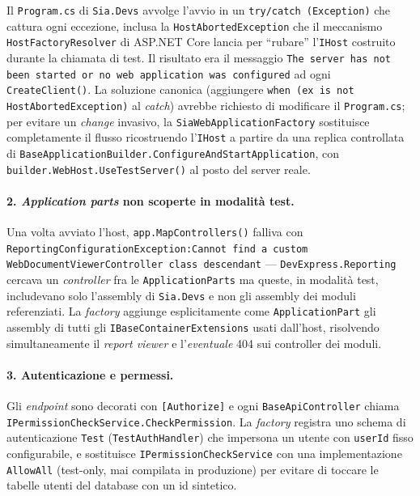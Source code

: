Il \texttt{Program.cs} di \texttt{Sia.Devs} avvolge l'avvio in un \texttt{try/catch (Exception)} che cattura ogni eccezione, inclusa la \texttt{HostAbortedException} che il meccanismo \texttt{HostFactoryResolver} di ASP.NET Core lancia per ``rubare'' l'\texttt{IHost} costruito durante la chiamata di test. Il risultato era il messaggio \texttt{The server has not been started or no web application was configured} ad ogni \texttt{CreateClient()}. La soluzione canonica (aggiungere \texttt{when (ex is not HostAbortedException)} al \emph{catch}) avrebbe richiesto di modificare il \texttt{Program.cs}; per evitare un \emph{change} invasivo, la \texttt{SiaWebApplicationFactory} sostituisce completamente il flusso ricostruendo l'\texttt{IHost} a partire da una replica controllata di \texttt{BaseApplicationBuilder.ConfigureAndStartApplication}, con \texttt{builder.WebHost.UseTestServer()} al posto del server reale.

\paragraph{2. \emph{Application parts} non scoperte in modalità test.}

Una volta avviato l'host, \texttt{app.MapControllers()} falliva con \texttt{Reporting\-Configuration\-Exception:Cannot find a custom WebDocumentViewerController class descendant} — \texttt{DevExpress.Reporting} cercava un \emph{controller} fra le \texttt{ApplicationParts} ma queste, in modalità test, includevano solo l'assembly di \texttt{Sia.Devs} e non gli assembly dei moduli referenziati. La \emph{factory} aggiunge esplicitamente come \texttt{ApplicationPart} gli assembly di tutti gli \texttt{IBaseContainerExtensions} usati dall'host, risolvendo simultaneamente il \emph{report viewer} e l'\emph{eventuale} 404 sui controller dei moduli.

\paragraph{3. Autenticazione e permessi.}

Gli \emph{endpoint} sono decorati con \texttt{[Authorize]} e ogni \texttt{BaseApiController} chiama \texttt{IPermissionCheckService.CheckPermission}. La \emph{factory} registra uno schema di autenticazione \texttt{Test} (\texttt{TestAuthHandler}) che impersona un utente con \texttt{userId} fisso configurabile, e sostituisce \texttt{IPermissionCheckService} con una implementazione \texttt{AllowAll} (test-only, mai compilata in produzione) per evitare di toccare le tabelle utenti del database con un id sintetico.

